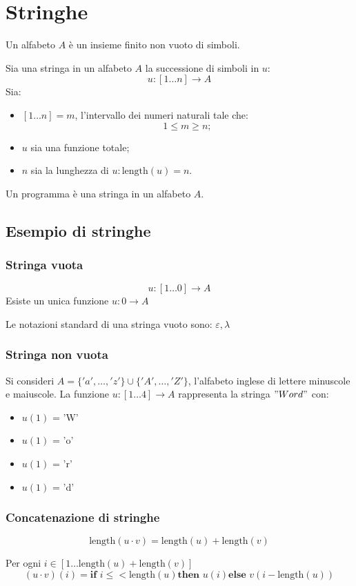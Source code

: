 \chapter{Stringhe}
\begin{theorem}
  Un alfabeto $A$ è un insieme finito non vuoto di simboli.
\end{theorem}
\begin{theorem}
  Sia una stringa in un alfabeto $A$ la successione di simboli in $u$:
  \[u:[1\dots n] \rightarrow A\]
  Sia:
  \begin{itemize}
    \item $[1\dots n] = m$, l'intervallo dei numeri naturali tale che:
      \[
        1\leq m\geq n;
      \]
    \item $u$ sia una funzione totale;
    \item $n$ sia la lunghezza di $u: \text{length}(u)=n$.
  \end{itemize}
\end{theorem}
\begin{theorem}
  Un programma è una stringa in un alfabeto $A$.
\end{theorem}

\section{Esempio di stringhe}
\subsection{Stringa vuota}
\[u: [1\dots0] \rightarrow A\]
Esiste un unica funzione $u: 0\rightarrow A$

Le notazioni standard di una stringa vuoto sono: $\varepsilon, \lambda$

\subsection{Stringa non vuota}
Si consideri $A=\{'a',\dots,'z'\}\cup\{'A',\dots,'Z'\}$, l'alfabeto inglese
di lettere minuscole e maiuscole.
La funzione $u:[1\dots4]\rightarrow A$ rappresenta la stringa $"Word"$ con:
\begin{itemize}
  \item $u(1)$ = 'W'
  \item $u(1)$ = 'o'
  \item $u(1)$ = 'r'
  \item $u(1)$ = 'd'
\end{itemize}

\subsection{Concatenazione di stringhe}
\begin{theorem}
  \[\text{length}(u\cdot v) = \text{length}(u) + \text{length}(v)\]
  
  Per ogni $i\in[1\dots \text{length}(u) + \text{length}(v)]$
  \[ (u\cdot v)(i) = \textbf{if } i\leq<\text{length}(u) \textbf{then } u(i)
  \textbf{else } v(i-\text{length}(u))\]
\end{theorem}

